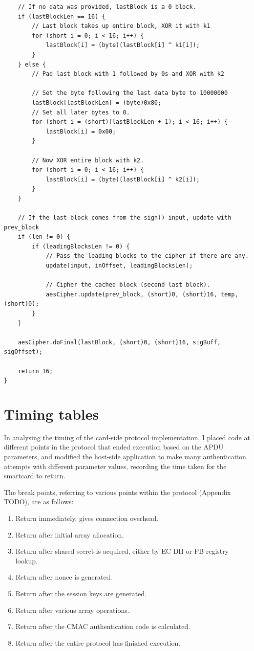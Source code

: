 \documentclass[12pt,a4paper]{article}
\begin{document}
\begin{verbatim}
    // If no data was provided, lastBlock is a 0 block.
    if (lastBlockLen == 16) {
        // Last block takes up entire block, XOR it with k1
        for (short i = 0; i < 16; i++) {
            lastBlock[i] = (byte)(lastBlock[i] ^ k1[i]);
        }
    } else {
        // Pad last block with 1 followed by 0s and XOR with k2

        // Set the byte following the last data byte to 10000000
        lastBlock[lastBlockLen] = (byte)0x80;
        // Set all later bytes to 0.
        for (short i = (short)(lastBlockLen + 1); i < 16; i++) {
            lastBlock[i] = 0x00;
        }

        // Now XOR entire block with k2.
        for (short i = 0; i < 16; i++) {
            lastBlock[i] = (byte)(lastBlock[i] ^ k2[i]);
        }
    }

    // If the last block comes from the sign() input, update with prev_block
    if (len != 0) {
        if (leadingBlocksLen != 0) {
            // Pass the leading blocks to the cipher if there are any.
            update(input, inOffset, leadingBlocksLen);

            // Cipher the cached block (second last block).
            aesCipher.update(prev_block, (short)0, (short)16, temp, (short)0);
        }
    }

    aesCipher.doFinal(lastBlock, (short)0, (short)16, sigBuff, sigOffset);

    return 16;
}
\end{verbatim}

\pagebreak
\section{Timing tables}
In analysing the timing of the card-side protocol implementation, I placed code at different points in the protocol that ended execution based on the APDU parameters, and modified the host-side application to make many authentication attempts with different parameter values, recording the time taken for the smartcard to return. 

The break points, referring to various points within the protocol (Appendix TODO), are as follows:
\begin{enumerate}
	\item Return immediately, gives connection overhead.
	\item Return after initial array allocation.
	\item Return after shared secret is acquired, either by EC-DH or PB registry lookup.
	\item Return after nonce is generated.
	\item Return after the session keys are generated.
	\item Return after various array operations.
	\item Return after the CMAC authentication code is calculated.
	\item Return after the entire protocol has finished execution.
\end{enumerate}
\end{document}
